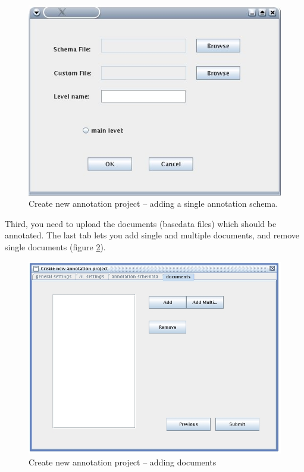 \documentclass[DIV12,english,11pt,halfparskip]{scrartcl}
\begin{document}
\begin{figure}[h]
  \centering
  \includegraphics[scale=0.5]{figs/AddSchemataDialog.jpg}
  \caption{Create new annotation project -- adding a single annotation
    schema.}
  \label{fig:createproject_annoschema}
\end{figure}

Third, you need to upload the documents (basedata files) which should
be annotated. The last tab lets you add single and multiple documents,
and remove single documents (figure \ref{fig:createproject_documents}).

\begin{figure}[h]
  \centering
  \includegraphics[scale=0.5]{figs/CreateProjectDocuments.jpg}
  \caption{Create new annotation project -- adding documents}
  \label{fig:createproject_documents}
\end{figure}
\end{document}
